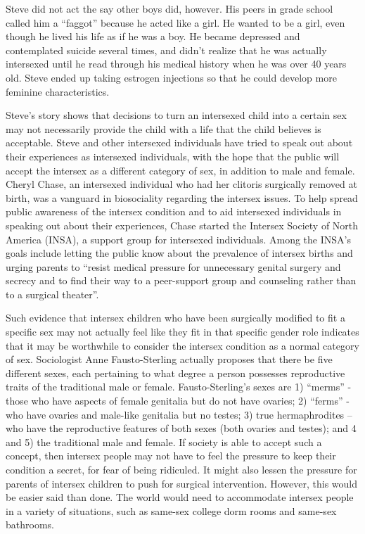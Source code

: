 Steve did not act the say other boys did, however. His peers in grade school called him a “faggot” because he acted like a girl. He wanted to be a girl, even though he lived his life as if he was a boy. He became depressed and contemplated suicide several times, and didn't realize that he was actually intersexed until he read through his medical history when he was over 40 years old. Steve ended up taking estrogen injections so that he could develop more feminine characteristics.  \cite{libidomag}

Steve's story shows that decisions to turn an intersexed child into a certain sex may not necessarily provide the child with a life that the child believes is acceptable.  Steve and other intersexed individuals have tried to speak out about their experiences as intersexed individuals, with the hope that the public will accept the intersex as a different category of sex, in addition to male and female. Cheryl Chase, an intersexed individual who had her clitoris surgically removed at birth, was a vanguard in biosociality regarding the intersex issues. To help spread public awareness of the intersex condition and to aid intersexed individuals in speaking out about their experiences, Chase started the Intersex Society of North America (INSA), a support group for intersexed individuals.  Among the INSA's goals include letting the public know about the prevalence of intersex births and urging parents to “resist medical pressure for unnecessary genital surgery and secrecy and to find their way to a peer-support group and counseling rather than to a surgical theater”. \cite{chase}
	
Such evidence that intersex children who have been surgically modified to fit a specific sex may not actually feel like they fit in that specific gender role indicates that it may be worthwhile to consider the intersex condition as a normal category of sex.  Sociologist Anne Fausto-Sterling actually proposes that there be five different sexes, each pertaining to what degree a person possesses reproductive traits of the traditional male or female. Fausto-Sterling's sexes are 1) “merms” - those who have aspects of female genitalia but do not have ovaries; 2) “ferms” - who have ovaries and male-like genitalia but no testes; 3) true hermaphrodites – who have the reproductive features of both sexes (both ovaries and testes); and 4 and 5) the traditional male and female. \cite{fausto} If society is able to accept such a concept, then intersex people may not have to feel the pressure to keep their condition a secret, for fear of being ridiculed. It might also lessen the pressure for parents of intersex children to push for surgical intervention. However, this would be easier said than done. The world would need to accommodate intersex people in a variety of situations, such as same-sex college dorm rooms and same-sex bathrooms.

